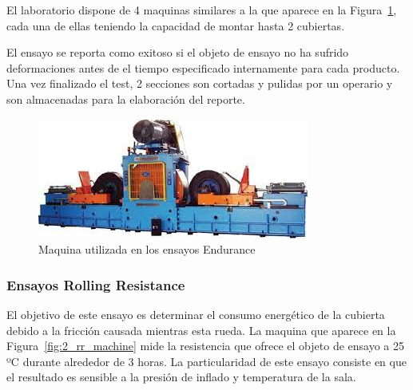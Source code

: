 El laboratorio dispone de 4 maquinas
similares a la que aparece en la Figura~\ref{fig:2_endurance_machine},
cada una de ellas teniendo la capacidad de montar hasta 2 cubiertas.

El ensayo se reporta como exitoso
si el objeto de ensayo no ha sufrido deformaciones
antes de el tiempo especificado internamente para cada producto.
Una vez finalizado el test, 2 secciones son cortadas y pulidas
por un operario y son almacenadas para la elaboración del reporte. 

\begin{figure}
	\begin{center}
		\includegraphics[width=\textwidth]{fig/2_endurance_machine}
	\end{center}
	\caption{Maquina utilizada en los ensayos Endurance}
	\label{fig:2_endurance_machine}
\end{figure}

\subsubsection{Ensayos Rolling Resistance}
El objetivo de este ensayo es determinar el consumo energético
de la cubierta debido a la fricción causada mientras esta rueda.
La maquina que aparece en la Figura~\ref{fig:2_rr_machine} mide la resistencia que ofrece
el objeto de ensayo a 25 ºC durante alrededor de 3 horas.
La particularidad de este ensayo consiste en que
el resultado es sensible a la presión de inflado y temperatura de la sala.

